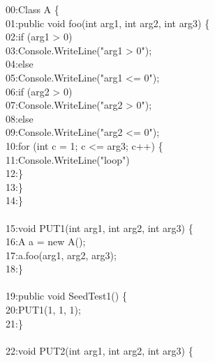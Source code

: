 \begin{figure}[t]
\begin{CodeOut}
00:Class A \{\\
01:\hspace*{0.2in}public void foo(int arg1, int arg2, int arg3) \{\\
02:\hspace*{0.4in}if (arg1 > 0)\\
03:\hspace*{0.6in}Console.WriteLine("arg1 > 0"); \\
04:\hspace*{0.4in}else\\
05:\hspace*{0.6in}Console.WriteLine("arg1 <= 0"); \\
06:\hspace*{0.4in}if (arg2 > 0)\\
07:\hspace*{0.6in}Console.WriteLine("arg2 > 0"); \\
08:\hspace*{0.4in}else\\
09:\hspace*{0.6in}Console.WriteLine("arg2 <= 0"); \\
10:\hspace*{0.4in}for (int c = 1; c <= arg3; c++)  \{ \\
11:\hspace*{0.6in}Console.WriteLine("loop") \\
12:\hspace*{0.4in}\}\\
13:\hspace*{0.2in}\}\\
14:\}\\
\\
15:void PUT1(int arg1, int arg2, int arg3) \{\\
16:\hspace*{0.2in}A a = new A();\\
17:\hspace*{0.2in}a.foo(arg1, arg2, arg3);\\
18:\}\\
\\
19:public void SeedTest1() \{\\
20:\hspace*{0.2in}PUT1(1, 1, 1);\\
21:\}\\
\\
22:void PUT2(int arg1, int arg2, int arg3) \{\\

\end{CodeOut}
\end{figure}
